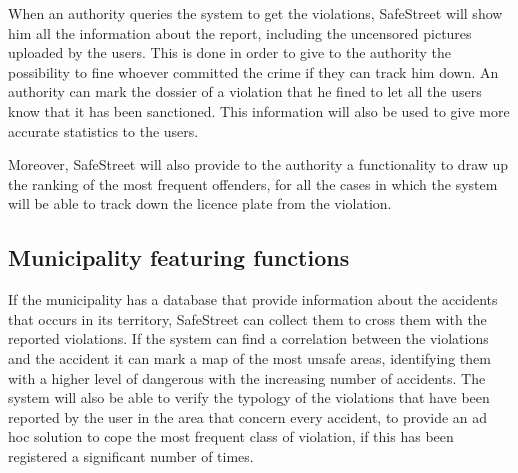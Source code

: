 \documentclass[../RASD.tex]{subfiles}
\begin{document}
    When an authority queries the system to get the violations, SafeStreet will show him all the information about the report, including the uncensored pictures uploaded by the users. This is done in order to give to the authority the possibility to fine whoever committed the crime if they can track him down. An authority can mark the dossier of a violation that he fined to let all the users know that it has been sanctioned. This information will also be used to give more accurate statistics to the users.

    Moreover, SafeStreet will also provide to the authority a functionality to draw up the ranking of the most frequent offenders, for all the cases in which the system will be able to track down the licence plate from the violation.
    \subsection{Municipality featuring functions}\label{subsec:municipality-featuring-functions}
    If the municipality has a database that provide information about the accidents that occurs in its territory, SafeStreet can collect them to cross them with the reported violations. If the system can find a correlation between the violations and the accident it can mark a map of the most unsafe areas, identifying them with a higher level of dangerous with the increasing number of accidents. The system will also be able to verify the typology of the violations that have been reported by the user in the area that concern every accident, to provide an ad hoc solution to cope the most frequent class of violation, if this has been registered a significant number of times.
\end{document}

